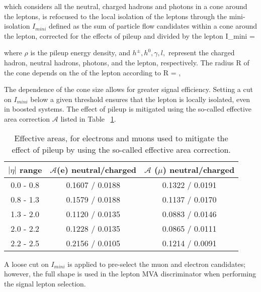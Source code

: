 \noindent which considers all the neutral, charged hadrons and photons in a cone around the leptons, is refocused to the local isolation of the leptons through the mini-isolation $I_{mini}$ \cite{i_mini} defined as the sum of particle flow candidates \pt within a cone around the lepton, corrected for the effects of pileup and divided by the lepton \pt
\beqn
I_{mini} =
\eeqn

\noindent where $\rho$ is the pileup energy density, and $h^\pm, h^0, \gamma, l,$ represent the charged hadron, neutral hadrons, photons, and the lepton, respectively. The radius R of the cone depends on the \pt of the lepton according to 
\beqn
R = ,
\eeqn

The \pt dependence of the cone size allows for greater signal efficiency. Setting a cut on $I_{mini}$ below a given threshold ensures that the lepton is locally isolated, even in boosted systems. The effect of pileup is mitigated using the so-called effective area correction $\mathcal{A}$ listed in Table ~\ref{tab:pileup_area}. 

\begin{table}[!htbp]
\centering
\small
\begin{tabular}{ccc}\hline
$|\eta|$ range & $\mathcal{A}$(e) neutral/charged & $\mathcal{A}$ ($\mu$) neutral/charged \\\hline
0.0 - 0.8      & 0.1607 / 0.0188                  & 0.1322 / 0.0191 \\
0.8 - 1.3      & 0.1579 / 0.0188                  & 0.1137 / 0.0170 \\
1.3 - 2.0      & 0.1120 / 0.0135                  & 0.0883 / 0.0146 \\
2.0 - 2.2      & 0.1228 / 0.0135                  & 0.0865 / 0.0111 \\
2.2 - 2.5      & 0.2156 / 0.0105                  & 0.1214 / 0.0091 \\ \hline
\end{tabular}
\caption[Effective areas, for electrons and muons.]{ Effective areas, for electrons and muons used to mitigate the effect of pileup by using the so-called effective area correction.}
\label{tab:pileup_area}
\end{table}

A loose cut on $I_{mini}$ is applied to pre-select the muon and electron candidates; however, the full shape is used in the lepton MVA discriminator when performing the signal lepton selection.

